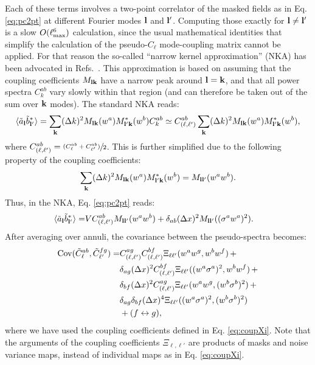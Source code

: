 \documentclass[a4paper,11pt]{article}
\begin{document}
        Each of these terms involves a two-point correlator of the masked fields as in Eq. \ref{eq:pc2pt} at different Fourier modes ${\bf l}$ and ${\bf l}'$. Computing those exactly for ${\bf l}\neq{\bf l}'$ is a slow $O(\ell^6_{\rm max})$ calculation, since the usual mathematical identities that simplify the calculation of the pseudo-$C_\ell$ mode-coupling matrix cannot be applied. For that reason the so-called ``narrow kernel approximation'' (NKA) has been advocated in Refs.~\cite{astro-ph/0307515,1906.11765}. This approximation is based on assuming that the coupling coefficients $M_{{\bf l}{\bf k}}$ have a narrow peak around ${\bf l}={\bf k}$, and that all power spectra $C^{ab}_k$ vary slowly within that region (and can therefore be taken out of the sum over ${\bf k}$ modes). The standard NKA reads:
        \begin{equation}\label{eq:nka}
          \langle \tilde{a}_{\bf l}\tilde{b}^*_{{\bf l}'}\rangle=\sum_{\bf k}(\Delta k)^2 M_{{\bf l}{\bf k}}(w^a)M_{{\bf l'}{\bf k}}^*(w^b)C^{ab}_k\simeq C^{ab}_{(\ell,\ell')}\sum_{\bf k}(\Delta k)^2 M_{{\bf l}{\bf k}}(w^a)M_{{\bf l'}{\bf k}}^*(w^b),
        \end{equation}
        where $C^{ab}_{(\ell,\ell')}=\sfrac{(C^{ab}_\ell+C^{ab}_{\ell'})}{2}$. This is further simplified due to the following property of the coupling coefficients:
        \begin{equation}\label{eq:coupling_product}
          \sum_{\bf k}(\Delta k)^2 M_{{\bf l}{\bf k}}(w^a)M_{{\bf l'}{\bf k}}^*(w^b) = M_{{\bf l}{\bf l}'}(w^aw^b).
        \end{equation}
        Thus, in the NKA, Eq. \ref{eq:pc2pt} reads:
        \begin{align}\label{eq:pc2pt_nka}
          \langle \tilde{a}_{\bf l}\tilde{b}^*_{{\bf l}'}\rangle=&VC^{ab}_{(\ell,\ell')}M_{{\bf l}{\bf l}'}(w^aw^b) + \delta_{ab}(\Delta x)^2M_{{\bf l}{\bf l}'}((\sigma^aw^a)^2).
        \end{align}
        After averaging over annuli, the covariance between the pseudo-spectra becomes:
        \begin{align}\nonumber
          {\rm Cov}(\tilde{C}^{ab}_\ell,\tilde{C}^{fg}_{\ell'})=
          &C^{ag}_{(\ell,\ell')}C^{bf}_{(\ell,\ell')} \Xi_{\ell\ell'}(w^aw^g,w^bw^f)\,+\\\nonumber
          &\delta_{ag}(\Delta x)^2 C^{bf}_{(\ell,\ell')} \Xi_{\ell\ell'}((w^a\sigma^a)^2,w^bw^f)\,+\\\nonumber
          &\delta_{bf}(\Delta x)^2 C^{ag}_{(\ell,\ell')} \Xi_{\ell\ell'}(w^aw^g,(w^b\sigma^b)^2)\,+\\\nonumber
          &\delta_{ag}\delta_{bf}(\Delta x)^4 \Xi_{\ell\ell'}((w^a\sigma^a)^2,(w^b\sigma^b)^2)\\\label{eq:covar_pcl}
          &+(f\leftrightarrow g),
        \end{align}
        where we have used the coupling coefficients defined in Eq. \ref{eq:coupXi}. Note that the arguments of the coupling coefficients $\Xi_{\ell,\ell'}$ are products of masks and noise variance maps, instead of individual maps as in Eq. \ref{eq:coupXi}.
      
\end{document}
